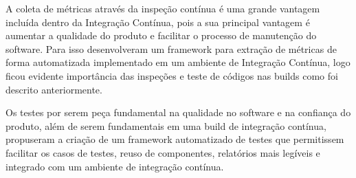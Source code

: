 A coleta de métricas através da inspeção contínua é uma grande vantagem incluída dentro da Integração Contínua, pois a sua principal vantagem é aumentar a qualidade do produto e facilitar o processo de manutenção do software. Para isso  desenvolveram um framework para extração de métricas de forma automatizada implementado em um ambiente de Integração Contínua, logo ficou evidente importância das inspeções e teste de códigos nas builds como foi descrito anteriormente.

Os testes por serem peça fundamental na qualidade no software e na confiança do produto, além de serem fundamentais em uma build de integração contínua,  propuseram a criação de um framework automatizado de testes que permitissem facilitar os casos de testes, reuso de componentes, relatórios mais legíveis e integrado com um ambiente de integração contínua.
